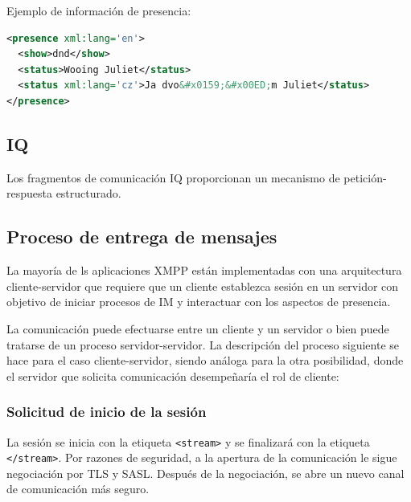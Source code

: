 \documentclass[a4paper, 11pt]{article} %
\begin{document}
    Ejemplo de información de presencia:
\begin{lstlisting}[language=XML]
<presence xml:lang='en'>
  <show>dnd</show>
  <status>Wooing Juliet</status>
  <status xml:lang='cz'>Ja dvo&#x0159;&#x00ED;m Juliet</status>
</presence>
\end{lstlisting}
  \subsection{IQ}
    Los fragmentos de comunicación IQ proporcionan un mecanismo de petición-respuesta estructurado.
  
  \subsection{Proceso de entrega de mensajes}
    La mayoría de ls aplicaciones XMPP están implementadas con una arquitectura cliente-servidor que requiere que un cliente
    establezca sesión en un servidor con objetivo de iniciar procesos de IM y interactuar con los aspectos de presencia.
    
    La comunicación puede efectuarse entre un cliente y un servidor o  bien puede tratarse de un proceso servidor-servidor.
    La descripción del proceso siguiente se hace para el caso cliente-servidor, siendo análoga para la otra posibilidad, 
    donde el servidor que solicita comunicación desempeñaría el rol de cliente:
  
    \subsubsection{Solicitud de inicio de la sesión}
      La sesión se inicia con la etiqueta \texttt{<stream>} y se finalizará con la etiqueta
      \texttt{</stream>}. Por razones de seguridad, a la apertura de la comunicación le sigue
      negociación por TLS y SASL. Después de la negociación, se abre un nuevo canal de comunicación
      más seguro.
      
\end{document}
